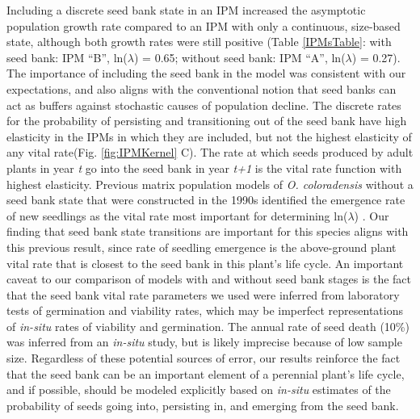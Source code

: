 \documentclass[12pt, letterpaper]{article}
\begin{document}
Including a discrete seed bank state in an IPM increased the asymptotic population growth rate compared to an IPM with only a continuous, size-based state, although both growth rates were still positive (Table \ref{IPMsTable}: with seed bank: IPM “B”, ln($\lambda$) = 0.65; without seed bank: IPM “A”, ln($\lambda$) = 0.27). The importance of including the seed bank in the model was consistent with our expectations, and also aligns with the conventional notion that seed banks can act as buffers against stochastic causes of population decline. The discrete rates for the probability of persisting and transitioning out of the seed bank have high elasticity in the IPMs in which they are included, but not the highest elasticity of any vital rate(Fig. \ref{fig:IPMKernel} C). The rate at which seeds produced by adult plants in year \textit{t} go into the seed bank in year \textit{t+1} is the vital rate function with highest elasticity. Previous matrix population models of \textit{O. coloradensis} without a seed bank state that were constructed in the 1990s identified the emergence rate of new seedlings as the vital rate most important for determining ln($\lambda$) \cite{Floyd1998}. Our finding that seed bank state transitions are important for this species aligns with this previous result, since rate of seedling emergence is the above-ground plant vital rate that is closest to the seed bank in this plant’s life cycle. An important caveat to our comparison of models with and without seed bank stages is the fact that the seed bank vital rate parameters we used were inferred from laboratory tests of germination and viability rates, which may be imperfect representations of \textit{in-situ} rates of viability and germination. The annual rate of seed death (10\%) was inferred from an \textit{in-situ} study, but is likely imprecise because of low sample size. Regardless of these potential sources of error, our results reinforce the fact that the seed bank can be an important element of a perennial plant’s life cycle, and if possible, should be modeled explicitly based on \textit{in-situ} estimates of the probability of seeds going into, persisting in, and emerging from the seed bank.      
\end{document}
